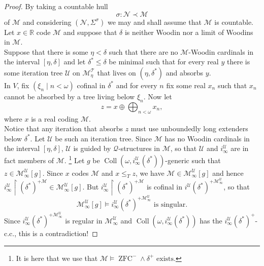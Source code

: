 \documentclass[12pt,a4paper]{article}
\theoremstyle{nicestyle}
\DeclareMathOperator{\zfc}{ZFC}
\DeclareMathOperator{\coll}{Coll}
\begin{document}
\begin{proof}
  By taking a countable hull
  \[
    \sigma \colon \mathcal{N} \prec \mathcal{M}
  \]
  of $\mathcal{M}$ and considering $(\mathcal{N}, \Sigma^{\sigma})$ we
  may and shall assume that $\mathcal{M}$ is countable. Let
  $x \in \mathbb{R}$ code $\mathcal{M}$ and suppose that $\delta$ is
  neither Woodin nor a limit of Woodins in $\mathcal{M}$. \\

  Suppose that there is some $\eta < \delta$ such that there are no
  $\mathcal{M}$-Woodin cardinals in the interval $[\eta, \delta]$ and
  let $\delta^{*} \le \delta$ be minimal such that for every real $y$
  there is some iteration tree $\mathcal{U}$ on
  $\mathcal{M}^{\mathcal{T}}_{\eta}$ that lives on
  $(\eta, \delta^{*})$ and absorbs $y$. \\

  In $V$, fix $(\xi_{n} \mid n < \omega)$ cofinal in $\delta^{*}$ and
  for every $n$ fix some real $x_{n}$ such that $x_{n}$ cannot be
  absorbed by a tree living below $\xi_{n}$. Now let
  \[
    z = x \oplus \bigoplus_{n < \omega} x_{n},
  \]
  where $x$ is a real coding $\mathcal{M}$. \\
  Notice that any iteration that absorbs $z$ must use unboundedly long
  extenders below $\delta^{*}$. Let $\mathcal{U}$ be such an iteration
  tree. Since $\mathcal{M}$ has no Woodin cardinals in the interval
  $[\eta, \delta]$, $\mathcal{U}$ is guided by
  $\mathcal{Q}$-structures in $\mathcal{M}$, so that $\mathcal{U}$ and
  $i_{\infty}^{\mathcal{U}}$ are in fact members of
  $\mathcal{M}$. \footnote{It is here that we use that
    $\mathcal{M} \models \zfc^{-} \wedge \delta^{+} \text{ exists}$.}
  Let $g$ be
  $\coll(\omega,i^{\mathcal{U}}_{\infty} (\delta^{*}))$-generic such
  that $z \in \mathcal{M}^{\mathcal{U}}_{\infty}[g]$. Since $x$ codes
  $\mathcal{M}$ and $x \le_{T} z$, we have
  $\mathcal{M} \in \mathcal{M}^{\mathcal{U}}_{\infty}[g]$ and hence
  $i^{\mathcal{U}}_{\infty} \restriction (\delta^{*})^{+\mathcal{M}}
  \in \mathcal{M}^{\mathcal{U}}_{\infty}[g]$. But
  $i^{\mathcal{U}}_{\infty} \restriction (\delta^{*})^{+\mathcal{M}}$
  is cofinal in
  $i^{\mathcal{U}}(\delta^{*})^{+
    \mathcal{M}^{\mathcal{U}}_{\infty}}$, so that
  \[
    \mathcal{M}^{\mathcal{U}}_{\infty}[g] \models i^{\mathcal{U}}_{\infty}(\delta^{*})^{+
    \mathcal{M}^{\mathcal{U}}_{\infty}} \text{ is singular}.
  \]
  Since
  $i^{\mathcal{U}}_{\infty}(\delta^{*})^{+
    \mathcal{M}^{\mathcal{U}}_{\infty}}$ is regular in
  $\mathcal{M}^{\mathcal{U}}_{\infty}$ and
  $\coll(\omega, i^{\mathcal{U}}_{\infty}(\delta^{*}))$ has the
  $i^{\mathcal{U}}_{\infty}(\delta^{*})^{+}$-c.c., this is a
  contradiction!
\end{proof}
\end{document}
